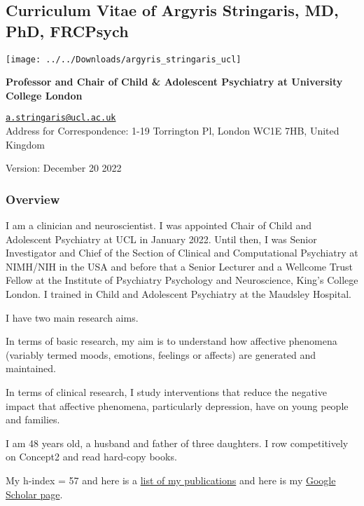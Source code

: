 \documentclass[
]{article}
\author{}
\date{\vspace{-2.5em}}
\begin{document}
\hypertarget{curriculum-vitae-of-argyris-stringaris-md-phd-frcpsych}{%
\subsection{Curriculum Vitae of Argyris Stringaris, MD, PhD,
FRCPsych}\label{curriculum-vitae-of-argyris-stringaris-md-phd-frcpsych}}

\begin{flushright}\texttt{[image: ../../Downloads/argyris\_stringaris\_ucl]} \end{flushright}

\textbf{Professor and Chair of Child \& Adolescent Psychiatry at
University College London}

\href{mailto:a.stringaris@ucl.ac.uk}{\nolinkurl{a.stringaris@ucl.ac.uk}}\\
Address for Correspondence: 1-19 Torrington Pl, London WC1E 7HB, United
Kingdom

Version: December 20 2022

\hypertarget{overview}{%
\subsubsection{Overview}\label{overview}}

I am a clinician and neuroscientist. I was appointed Chair of Child and
Adolescent Psychiatry at UCL in January 2022. Until then, I was Senior
Investigator and Chief of the Section of Clinical and Computational
Psychiatry at NIMH/NIH in the USA and before that a Senior Lecturer and
a Wellcome Trust Fellow at the Institute of Psychiatry Psychology and
Neuroscience, King's College London. I trained in Child and Adolescent
Psychiatry at the Maudsley Hospital.

I have two main research aims.

In terms of basic research, my aim is to understand how affective
phenomena (variably termed moods, emotions, feelings or affects) are
generated and maintained.

In terms of clinical research, I study interventions that reduce the
negative impact that affective phenomena, particularly depression, have
on young people and families.

I am 48 years old, a husband and father of three daughters. I row
competitively on Concept2 and read hard-copy books.

My h-index = 57 and here is a
\href{https://pubmed.ncbi.nlm.nih.gov/?term=stringaris+a\&sort=date}{list
of my publications} and here is my
\href{https://scholar.google.com/citations?user=9B82424AAAAJ\&hl=en\&oi=ao}{Google
Scholar page}.
\end{document}
